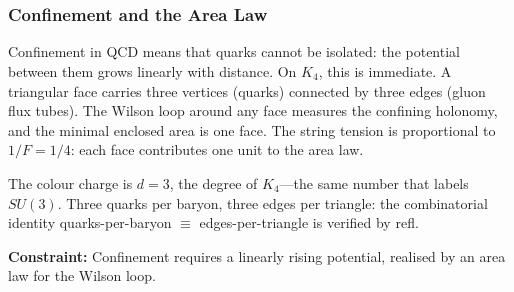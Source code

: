 \documentclass[11pt,a4paper]{book}
\def\mathrm#1{#1}%
\def\texttt#1{#1}%
\begin{document}
\begin{code}
\>[0]\AgdaSpace{}%
\AgdaSymbol{:}\AgdaSpace{}%
\<%
\\
\>[0]\AgdaSpace{}%
\AgdaSymbol{=}\AgdaSpace{}%
\AgdaSpace{}%
\AgdaSpace{}%
%
\>[51]\<%
\\
%
\\[\AgdaEmptyExtraSkip]%
\>[0]\AgdaSpace{}%
\AgdaSymbol{:}\AgdaSpace{}%
\<%
\\
\>[0]\AgdaSpace{}%
\AgdaSymbol{=}\AgdaSpace{}%
%
\>[45]\<%
\\
%
\\[\AgdaEmptyExtraSkip]%
\>[0]\AgdaSpace{}%
\AgdaSymbol{:}\AgdaSpace{}%
\AgdaSpace{}%
\AgdaSpace{}%
\<%
\\
\>[0]\AgdaSpace{}%
\AgdaSymbol{=}\AgdaSpace{}%
\<%
\end{code}

\subsubsection*{Confinement and the Area Law}

Confinement in QCD means that quarks cannot be isolated: the potential
between them grows linearly with distance.  On $K_4$, this is immediate.
A triangular face carries three vertices (quarks) connected by three
edges (gluon flux tubes).  The Wilson loop around any face measures
the confining holonomy, and the minimal enclosed area is one face.
The string tension is proportional to $1/F = 1/4$: each face contributes
one unit to the area law.

The colour charge is $d = 3$, the degree of $K_4$---the same number
that labels $\mathrm{SU}(3)$.  Three quarks per baryon, three edges per
triangle: the combinatorial identity \texttt{quarks-per-baryon $\equiv$
edges-per-triangle} is verified by \texttt{refl}.

\textbf{Constraint:}
Confinement requires a linearly rising potential, realised by an
area law for the Wilson loop.
\end{document}
